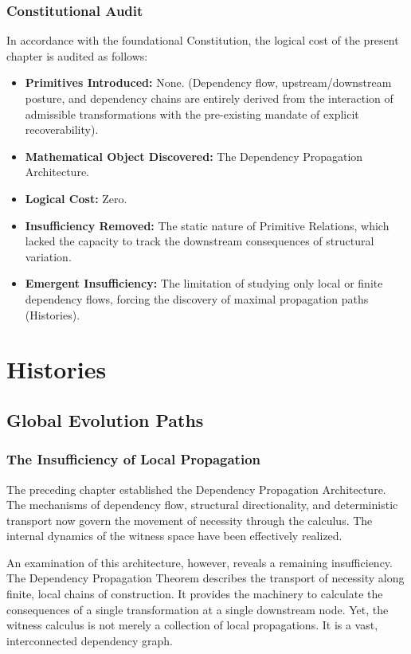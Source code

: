 \documentclass[12pt,anyside]{book}
\begin{document}
\subsection{Constitutional Audit}
In accordance with the foundational Constitution, the logical cost of the present chapter is audited as follows:
\begin{itemize}
    \item \textbf{Primitives Introduced:} None. (Dependency flow, upstream/downstream posture, and dependency chains are entirely derived from the interaction of admissible transformations with the pre-existing mandate of explicit recoverability).
    \item \textbf{Mathematical Object Discovered:} The Dependency Propagation Architecture.
    \item \textbf{Logical Cost:} Zero.
    \item \textbf{Insufficiency Removed:} The static nature of Primitive Relations, which lacked the capacity to track the downstream consequences of structural variation.
    \item \textbf{Emergent Insufficiency:} The limitation of studying only local or finite dependency flows, forcing the discovery of maximal propagation paths (Histories).
\end{itemize}


\chapter{Histories}
\setlength{\parindent}{0pt}

\section{Global Evolution Paths}

\subsection{The Insufficiency of Local Propagation}
The preceding chapter established the Dependency Propagation Architecture. The mechanisms of dependency flow, structural directionality, and deterministic transport now govern the movement of necessity through the calculus. The internal dynamics of the witness space have been effectively realized.

An examination of this architecture, however, reveals a remaining insufficiency. The Dependency Propagation Theorem describes the transport of necessity along finite, local chains of construction. It provides the machinery to calculate the consequences of a single transformation at a single downstream node. Yet, the witness calculus is not merely a collection of local propagations. It is a vast, interconnected dependency graph. 
\end{document}
